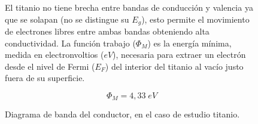 \documentclass[a4paper]{article}
\begin{document}
\begin{figure}[H]
\begin{minipage}[c]{0.45\textwidth}

El titanio no tiene brecha entre bandas de conducción y valencia ya que se solapan (no se distingue su $E_g$), esto permite el movimiento de electrones libres entre ambas bandas obteniendo alta conductividad. La función trabajo ($\Phi_M $) es la energía mínima, medida en electronvoltios (\(eV\)), necesaria para extraer un electrón desde el nivel de Fermi (\(E_{F}\)) del interior del titanio al vacío justo fuera de su superficie. 

\begin{equation}
	\Phi_M = 4,33 \; eV 
\end{equation}

\end{minipage}
\hfill
\begin{minipage}[c]{0.5\textwidth}
	\centering
	
\end{minipage}

\caption{Diagrama de banda del conductor, en el caso de estudio titanio.}
\end{figure}
\end{document}
